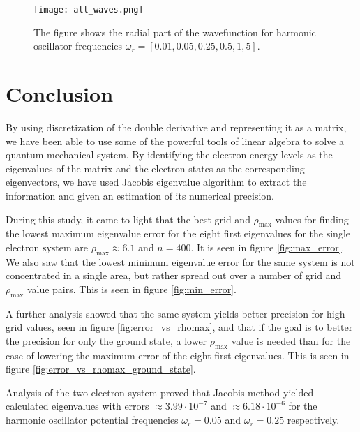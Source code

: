 \documentclass{emulateapj}
\begin{document}
        \begin{figure}[t]
            \centering
            \texttt{[image: all\_waves.png]}
            \caption{The figure shows the radial part of the wavefunction for harmonic oscillator frequencies $\omega_r = [0.01, 0.05, 0.25, 0.5, 1, 5]$.}
            \label{fig:all_waves}
        \end{figure}{}
        
    
    

\section{\textbf{Conclusion}}
    By using discretization of the double derivative and representing it as a matrix, we have been able to use some of the powerful tools of linear algebra to solve a quantum mechanical system. By identifying the electron energy levels as the eigenvalues of the matrix and the electron states as the corresponding eigenvectors, we have used Jacobis eigenvalue algorithm to extract the information and given an estimation of its numerical precision.
    
    During this study, it came to light that the best grid and $\rho_{\text{max}}$ values for finding the lowest maximum eigenvalue error for the eight first eigenvalues for the single electron system are $\rho_{\text{max}} \approx 6.1$ and $n = 400$. It is seen in figure \ref{fig:max_error}. We also saw that the lowest minimum eigenvalue error for the same system is not concentrated in a single area, but rather spread out over a number of grid and $\rho_{\text{max}}$ value pairs. This is seen in figure \ref{fig:min_error}.
    
    A further analysis showed that the same system yields better precision for high grid values, seen in figure \ref{fig:error_vs_rhomax}, and that if the goal is to better the precision for only the ground state, a lower $\rho_{\text{max}}$ value is needed than for the case of lowering the maximum error of the eight first eigenvalues. This is seen in figure \ref{fig:error_vs_rhomax_ground_state}.
    
    Analysis of the two electron system proved that Jacobis method yielded calculated eigenvalues with errors $\approx 3.99 \cdot 10^{-7}$ and $\approx 6.18 \cdot 10^{-6}$ for the harmonic oscillator potential frequencies $\omega_r = 0.05$ and $\omega_r = 0.25$ respectively.
    
\end{document}
